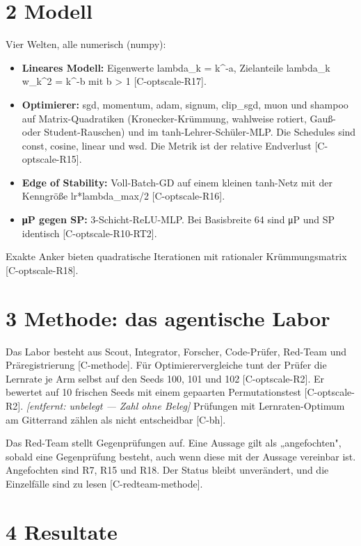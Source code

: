 \documentclass[10pt,twocolumn]{article}
\begin{document}
\section{2 Modell}

Vier Welten, alle numerisch (numpy):

\begin{itemize}
\item \textbf{Lineares Modell:} Eigenwerte lambda_k = k^-a, Zielanteile lambda_k w_k^2 = k^-b mit b > 1 {\scriptsize[C-optscale-R17]}.
\item \textbf{Optimierer:} sgd, momentum, adam, signum, clip_sgd, muon und shampoo auf Matrix-Quadratiken (Kronecker-Krümmung, wahlweise rotiert, Gauß- oder Student-Rauschen) und im tanh-Lehrer-Schüler-MLP. Die Schedules sind const, cosine, linear und wsd. Die Metrik ist der relative Endverlust {\scriptsize[C-optscale-R15]}.
\item \textbf{Edge of Stability:} Voll-Batch-GD auf einem kleinen tanh-Netz mit der Kenngröße lr*lambda_max/2 {\scriptsize[C-optscale-R16]}.
\item \textbf{μP gegen SP:} 3-Schicht-ReLU-MLP. Bei Basisbreite 64 sind μP und SP identisch {\scriptsize[C-optscale-R10-RT2]}.
\end{itemize}

Exakte Anker bieten quadratische Iterationen mit rationaler Krümmungsmatrix {\scriptsize[C-optscale-R18]}.

\section{3 Methode: das agentische Labor}

Das Labor besteht aus Scout, Integrator, Forscher, Code-Prüfer, Red-Team und Präregistrierung {\scriptsize[C-methode]}. Für Optimierervergleiche tunt der Prüfer die Lernrate je Arm selbst auf den Seeds 100, 101 und 102 {\scriptsize[C-optscale-R2]}. Er bewertet auf 10 frischen Seeds mit einem gepaarten Permutationstest {\scriptsize[C-optscale-R2]}. \emph{[entfernt: unbelegt — Zahl ohne Beleg]} Prüfungen mit Lernraten-Optimum am Gitterrand zählen als nicht entscheidbar {\scriptsize[C-bh]}.

Das Red-Team stellt Gegenprüfungen auf. Eine Aussage gilt als „angefochten", sobald eine Gegenprüfung besteht, auch wenn diese mit der Aussage vereinbar ist. Angefochten sind R7, R15 und R18. Der Status bleibt unverändert, und die Einzelfälle sind zu lesen {\scriptsize[C-redteam-methode]}.

\section{4 Resultate}
\end{document}
